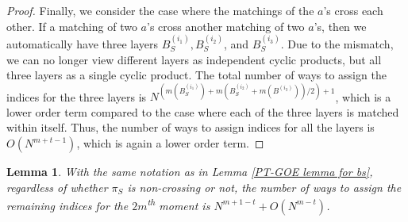 \documentclass[11pt,reqno]{amsart}
\numberwithin{equation}{section}
\theoremstyle{plain}
\newtheorem{lemma}[thm]{Lemma}
\begin{document}
\begin{proof}

Finally, we consider the case where the matchings of the $a$'s cross each other. If a matching of two $a$'s cross another matching of two $a$'s, then we automatically have three layers $B^{(i_1)}_S, B^{(i_2)}_S$, and $B^{(i_3)}_S$. Due to the mismatch, we can no longer view different layers as independent cyclic products, but all three layers as a single cyclic product. The total number of ways to assign the indices for the three layers is $N^{(m(B^{(i_1)}_S)+m(B^{(i_2)}_S+m(B^{(i_3)}))/2)+1}$, which is a lower order term compared to the case where each of the three layers is matched within itself. Thus, the number of ways to assign indices for all the layers is $O(N^{m+t-1})$, which is again a lower order term. 
\end{proof}

\begin{lemma}\label{PT-GOE lemma for as}
With the same notation as in Lemma \ref{PT-GOE lemma for bs}, regardless of whether $\pi_S$ is non-crossing or not, the number of ways to assign the remaining indices for the $2m$\textsuperscript{th} moment is $N^{m+1-t}+O(N^{m-t})$.
\end{lemma}
\end{document}
